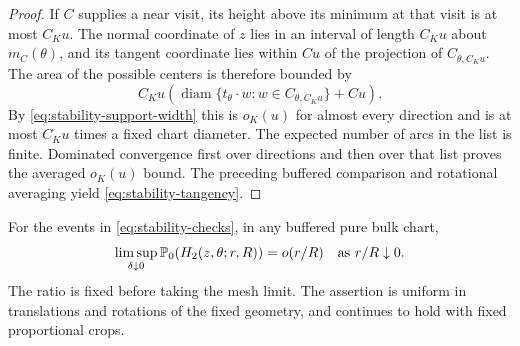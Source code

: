 \begin{proof}
If $C$ supplies a near visit, its height above its minimum at that
visit is at most $C_Ku$.  The normal coordinate of $z$ lies in an
interval of length $C_Ku$ about $m_C(\theta)$, and its tangent
coordinate lies within $Cu$ of the projection of $C_{\theta,C_Ku}$.
The area of the possible centers is therefore bounded by
\[
 C_Ku\left(\operatorname{diam}
          \{t_\theta\cdot w:w\in C_{\theta,C_Ku}\}+Cu\right).
\]
By \eqref{eq:stability-support-width} this is $o_K(u)$ for almost
every direction and is at most $C_Ku$ times a fixed chart diameter.
The expected number of arcs in the list is finite.  Dominated
convergence first over directions and then over that list proves
the averaged $o_K(u)$ bound.  The preceding buffered comparison and
rotational averaging yield \eqref{eq:stability-tangency}.
\end{proof}

\begin{proposition}
\label{prop:pure-half-plane}
For the events in \eqref{eq:stability-checks}, in any buffered pure
bulk chart,
\begin{equation}
 \limsup_{\delta\downarrow0}\P_0(H_2(z,\theta;r,R))=o(r/R)
 \quad\text{as }r/R\downarrow0.
 \label{eq:stability-halfplane}
\end{equation}
The ratio is fixed before taking the mesh limit.  The assertion is
uniform in translations and rotations of the fixed geometry, and
continues to hold with fixed proportional crops.
\end{proposition}

